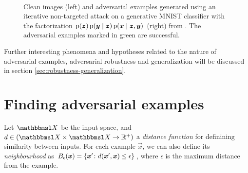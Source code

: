 \documentclass[conference,compsoc]{IEEEtran}
\begin{document}
\begin{figure}[htbp!]
	\begin{center}
		\
	\end{center}
	\caption{Clean images (left) and adversarial examples generated using an iterative non-targeted attack on a generative MNIST \citep{LeCun:2015:DL} classifier with the factorization $\operatorname{\mathrm{p}}(\boldsymbol{z})\operatorname{\mathrm{p}}(\boldsymbol{y}\mid\boldsymbol{z})\operatorname{\mathrm{p}}(\boldsymbol{x}\mid\boldsymbol{z},\boldsymbol{y})$ (right) from \citet{Li:2019:AGCMRAA}. The adversarial examples marked in green are successful.}
	\label{fig:li-gfz-adversarial-examples-mnist}
\end{figure}

Further interesting phenomena and hypotheses related to the nature of adversarial examples, adversarial robustness and generalization will be discussed in section \ref{sec:robustness-generalization}.


\section{Finding adversarial examples} \label{sec:finding-adversarial-examples}

Let $\set X$ be the input space,
and $d\in(\set X\times\set X\to \R^+)$ a \textit{distance function} for definining similarity between inputs. 
For each example $\vec x$, 
we can also define its \textit{neighbourhood} as $B_{\epsilon}(\vec x) = \cbr{\vec x'\colon d(\vec x', \vec x) \leq \epsilon}$,
where $\epsilon$ is the maximum distance from the example.
\end{document}
